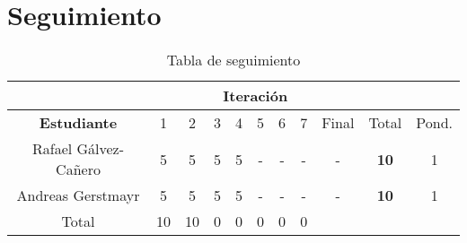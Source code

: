 \section{Seguimiento}

\begin{table}[htdp]
\begin{center}
\begin{tabular}{|c|c|c|c|c|c|c|c|c|c|c|}
\cline{2-9}
\multicolumn{1}{c}{}&\multicolumn{8}{|c|}{\textbf{Iteración}}&\multicolumn{2}{c}{}\\
\hline
\textbf{Estudiante}&1&2&3&4&5&6&7&Final&Total&Pond.\\
\hline
Rafael Gálvez-Cañero&5&5&5&5&-&-&-&-&\textbf{10}&1\\
Andreas Gerstmayr   &5&5&5&5&-&-&-&-&\textbf{10}&1\\
\hline
Total               &10&10&0&0&0&0&0&\multicolumn{2}{c}{}\\
\cline{1-8}
\end{tabular}
\end{center}
\caption{Tabla de seguimiento}
\label{tab:seguimiento}
\end{table}%
